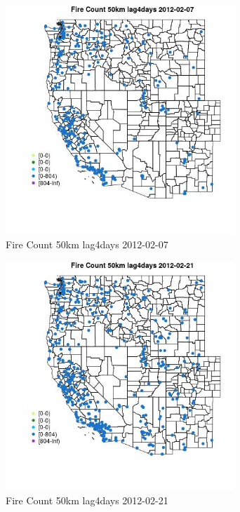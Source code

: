 \begin{figure} 
\centering  
\includegraphics[width=0.77\textwidth]{Code_Outputs/Report_ML_input_PM25_Step4_part_f_de_duplicated_aveswNAs_MapObsFire_Count_50km_lag4days2012-02-07.jpg} 
\caption{\label{fig:Report_ML_input_PM25_Step4_part_f_de_duplicated_aveswNAsMapObsFire_Count_50km_lag4days2012-02-07}Fire Count 50km lag4days 2012-02-07} 
\end{figure} 
 

\clearpage 

\begin{figure} 
\centering  
\includegraphics[width=0.77\textwidth]{Code_Outputs/Report_ML_input_PM25_Step4_part_f_de_duplicated_aveswNAs_MapObsFire_Count_50km_lag4days2012-02-21.jpg} 
\caption{\label{fig:Report_ML_input_PM25_Step4_part_f_de_duplicated_aveswNAsMapObsFire_Count_50km_lag4days2012-02-21}Fire Count 50km lag4days 2012-02-21} 
\end{figure} 
 

